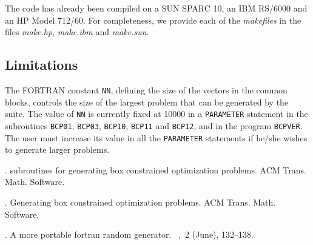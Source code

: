 The code has already been compiled on a SUN SPARC 10, 
an IBM RS/6000 and an HP Model 712/60. For completeness, we provide 
each of the {\em makefiles\/} in the files {\em make.hp}, {\em make.ibm}
and {\em make.sun}.

\subsection{Limitations\label{lastsub}}

The FORTRAN constant {\tt NN}, defining the size of the vectors in the common
blocks, controls the size of the largest problem that can be generated 
by the suite. 
The value of {\tt NN} is currently fixed 
at 10000 in a {\tt PARAMETER} statement in the 
subroutines {\tt BCP01}, 
{\tt BCP03}, {\tt BCP10}, {\tt BCP11} and {\tt BCP12}, and 
in the program 
{\tt BCPVER}. The user must increase its value in all the 
{\tt PARAMETER} 
statements if he/she wishes to generate larger problems.

%
%

\begin{thebibliography}{}

 .
 subroutines for generating box constrained optimization
  problems.
\newblock ACM Trans. Math. Software.

 .
\newblock Generating box constrained optimization problems.
\newblock ACM Trans. Math. Software.

 .
\newblock A more portable fortran random generator.
\newblock {}~,~2 (June),
  132--138.

\end{thebibliography}

\newpage

\appendix
\label{parameters}


